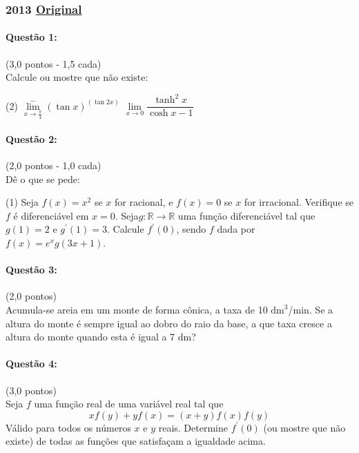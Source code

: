 \documentclass[12pt,a4paper]{article}
\newcommand{\R}{\mathbb{R}}
\newcommand{\original}[1]{\tiny \href{#1}{Original} \normalsize}
\begin{document}
\newpage

\subsubsection{2013  \original{https://drive.google.com/file/d/1CqLJEQ23GQSyvgVnIj5N87Fysyl9ZtSt/view?usp=sharing}}

\paragraph{Questão 1: }(3,0 pontos - 1,5 cada)\\
Calcule ou mostre que não existe:
\begin{tasks}(2)
    \task $\lim\limits_{x\to \frac{\pi}{4}}^{-} \left(\tan x\right)^{(\tan2x)}$
    \task $\lim\limits_{x\to 0} \dfrac{\tanh^2{x}}{\cosh x - 1}$
\end{tasks}

\paragraph{Questão 2: }(2,0 pontos - 1,0 cada)\\
Dê o que se pede:
\begin{tasks}(1)
\task Seja $f(x)= x^2$ se $x$ for racional, e $f(x) = 0$ se $x$ for irracional. Verifique se $f$ é diferenciável em $x=0$.
\task Seja$g: \R \to \R$ uma função diferenciável tal que $g(1) = 2$ e $g^{\prime}(1) = 3$. Calcule $f^{\prime}(0)$, sendo $f$ dada por $f(x) = e^x g(3x+1)$.
\end{tasks}

\paragraph{Questão 3: }(2,0 pontos)\\
Acumula-se areia em um monte de forma cônica, a taxa de 10 $\mathrm{dm}^3$/min. Se a altura do monte é sempre igual ao dobro do raio da base, a que taxa cresce a altura do monte quando esta é igual a 7 dm?

\paragraph{Questão 4: }(3,0 pontos)\\
Seja $f$ uma função real de uma variável real tal que 
$$xf(y) + yf(x) = (x+y)f(x)f(y)$$
Válido para todos os números $x$ e $y$ reais.
Determine $f^{\prime}(0)$ (ou mostre que não existe) de todas as funções que satisfaçam a igualdade acima.
\end{document}
